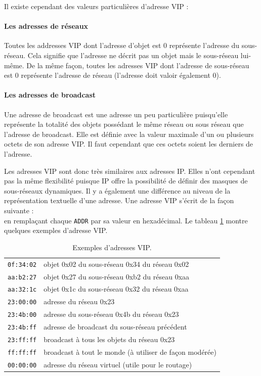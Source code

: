 			Il existe cependant des valeurs particulières d'adresse VIP : 
			\paragraph{Les adresses de réseaux}
				Toutes les addresses VIP dont l'adresse d'objet est 0 représente l'adresse du 
				sous-réseau. Cela signifie que l'adresse ne décrit pas un objet mais le 
sous-réseau 
				lui-même. De la même façon, toutes les adresses VIP dont l'adresse de sous-réseau est 0 
				représente 	l'adresse de réseau (l'adresse doit valoir également 0).
				
			\paragraph{Les adresses de broadcast}
				Une adresse de broadcast est une adresse un peu particulière puisqu'elle représente la
				totalité des objets possédant le même réseau ou sous réseau que l'adresse de broadcast.
				Elle est définie avec la valeur maximale d'un ou plusieurs octets de son adresse VIP.
				Il faut cependant que ces octets soient les derniers de l'adresse.
				
			Les adresses VIP sont donc très similaires aux adresses IP. Elles n'ont cependant pas la
			même flexibilité puisque IP offre la possibilité de définir des masques de sous-réseaux
			dynamiques. Il y a également une différence au niveau de la représentation textuelle d'une
			adresse. Une adresse VIP s'écrit de la façon suivante : \\
			en remplaçant chaque \texttt{ADDR} par sa valeur en hexadécimal. 
			Le tableau \ref{vipExample} montre quelques exemples d'adresse VIP.

			\begin{table}[!ht]
				\centering
				\begin{tabular}{ll}
					\texttt{0f:34:02} & objet 0x02 du sous-réseau 0x34 du réseau 0x02 \\
					\texttt{aa:b2:27} & objet 0x27 du sous-réseau 0xb2 du réseau 0xaa \\
					\texttt{aa:32:1c} & objet 0x1c du sous-réseau 0x32 du réseau 0xaa \\
					\texttt{23:00:00}	& adresse du réseau 0x23	\\
					\texttt{23:4b:00}	& adresse du sous-réseau 0x4b du réseau 0x23 \\
					\texttt{23:4b:ff}	& adresse de broadcast du sous-réseau précédent \\
					\texttt{23:ff:ff}	& broadcast à tous les objets du réseau 0x23 \\
					\texttt{ff:ff:ff}	& broadcast à tout le monde (à utiliser de façon modérée) \\
					\texttt{00:00:00}	& adresse du réseau virtuel (utile pour le routage) \\
				\end{tabular}
				\caption{Exemples d'adresses VIP.}
				\label{vipExample}
			\end{table}


